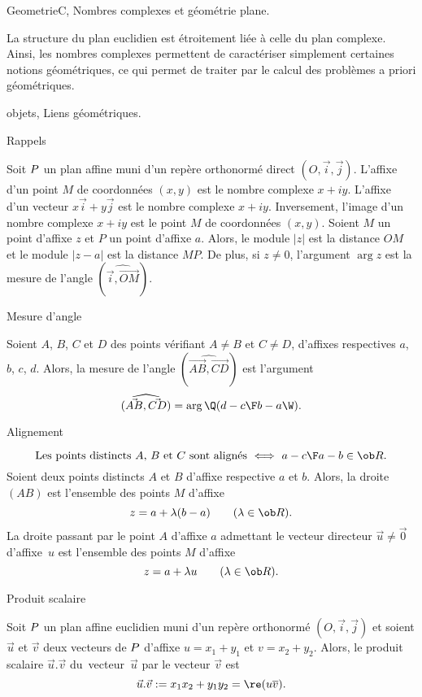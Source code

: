 \medskip

\Section GeometrieC, Nombres complexes et géométrie plane. 


La structure du plan euclidien est étroitement liée à celle du plan complexe. Ainsi, 
les nombres complexes permettent de caractériser simplement certaines notions géo\-mé\-tri\-ques, 
ce qui permet de traiter par le calcul 
des problèmes a priori géométriques. 
\bigskip


\Subsection objets, Liens géométriques. 

\Concept [] Rappels

\noindent
Soit $\sc P$ un plan affine muni d'un repère orthonormé direct $(O,\vec i,\vec j)$. \pn
{L'affixe d'un point} $M$ de coordonnées $(x,y)$ est le nombre complexe $x+i y$.\pn
{L'affixe d'un vecteur} $x\vec i+y\vec j$ est le nombre complexe $x+iy$. \pn
Inversement, {l'image d'un nombre complexe} $x+iy$ est le point $M$ de coordonnées $(x,y)$. \pn
Soient $M$ un point d'affixe $z$ et $P$ un point d'affixe $a$. \pn
Alors, le module {$|z|$ est la distance $OM$} 
et le module {$|z-a|$ est la distance $MP$}. \pn
De plus, si $z\neq0$, l'argument {$\arg z$ est la mesure de l'angle $(\widehat{\vec i,\vec {OM}})$}.



\Concept [] Mesure d'angle

\noindent
Soient $A$, $B$, $C$ et $D$ des points vérifiant $A\neq B$ et $C\neq D$, d'affixes respectives $a$, $b$, $c$, $d$. \pn
Alors, la mesure de l'angle $(\widehat{\vec{AB},\vec {CD}})$ est l'argument 
$$
{(\widehat{\vec{AB},\vec {CD}})=\arg\Q({d-c\F b-a}\W)}.
$$

\Concept [] Alignement

$$
{\mbox{Les points distincts $A$, $B$ et $C$ sont alignés}\ \Longleftrightarrow\ {a-c\F a-b}\in\ob R}. 
$$
\medskip\noindent
Soient deux points distincts $A$ et $B$ d'affixe respective $a$ et $b$. Alors, la droite $(AB)$ est l'ensemble des points $M$ d'affixe 
$$
z=a+\lambda (b-a)\qquad(\lambda\in\ob R).
$$
La droite passant par le point $A$ d'affixe $a$ admettant le vecteur directeur $\vec u\neq\vec0$ d'affixe~$u$ est l'ensemble des points $M$ d'affixe 
$$
z=a+\lambda u\qquad(\lambda\in\ob R).
$$


\Concept [] Produit scalaire

\noindent
Soit $\sc P$ un plan affine euclidien muni d'un repère orthonormé $(O,\vec i,\vec j)$ et soient $\vec u$ et $\vec v$ deux vecteurs de $\sc P$ d'affixe $u=x_1+y_1$ et $v=x_2+y_2$. 
Alors, le produit scalaire $\vec u.\vec v$ du~vecteur~$\vec u$ par le vecteur $\vec v$ est 
$$
{\vec u.\vec v:=x_1x_2+y_1y_2=\re(u\overline v)}.
$$

